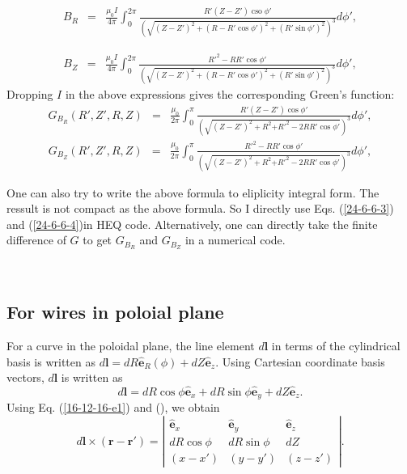 \documentclass{llncs}
\newcommand{\tmop}[1]{\ensuremath{\operatorname{#1}}}
\begin{document}
\begin{eqnarray*}
  B_R & = & \frac{\mu_0 I}{4 \pi} \int_0^{2 \pi} \frac{R'  (Z - Z') \tmop{cso}
  \phi'}{\left( \sqrt{(Z - Z')^2 + (R - R' \cos \phi')^2 + (R' \sin \phi')^2}
  \right)^3} d \phi',
\end{eqnarray*}

\begin{eqnarray*}
  B_Z & = & \frac{\mu_0 I}{4 \pi} \int_0^{2 \pi} \frac{{R'}^2 - R R' \cos
  \phi'}{\left( \sqrt{(Z - Z')^2 + (R - R' \cos \phi')^2 + (R' \sin \phi')^2}
  \right)^3} d \phi',
\end{eqnarray*}
Dropping $I$ in the above expressions gives the corresponding Green's
function:
\begin{eqnarray}
  \label{24-6-6-3} G_{B_R} (R', Z', R, Z) & = & \frac{\mu_0}{2 \pi}
  \int_0^{\pi} \frac{R' (Z - Z') \cos \phi'}{\left( \sqrt{(Z - Z')^2 + R^2 {+
  R'}^2 - 2 R R' \cos \phi'} \right)^3} d \phi', 
\end{eqnarray}
\begin{eqnarray}
  \label{24-6-6-4} G_{B_Z} (R', Z', R, Z) & = & \frac{\mu_0}{2 \pi}
  \int_0^{\pi} \frac{{R'}^2 - R R' \cos \phi'}{\left( \sqrt{(Z - Z')^2 + R^2
  {+ R'}^2 - 2 R R' \cos \phi'} \right)^3} d \phi', 
\end{eqnarray}


One can also try to write the above formula to eliplicity integral form. The
ressult is not compact as the above formula. So I directly use Eqs.
(\ref{24-6-6-3}) and (\ref{24-6-6-4})\quad in HEQ code. Alternatively, one can
directly take the finite difference of $G$ to get $G_{B_R}$ and $G_{B_Z}$ in a
numerical code.

\

\subsection{For wires in poloial plane}

For a curve in the poloidal plane, the line element $d\mathbf{l}$ in terms of
the cylindrical basis is written as $d\mathbf{l}= d R \hat{\mathbf{e}}_R
(\phi) + d Z \hat{\mathbf{e}}_z$. Using Cartesian coordinate basis vectors,
$d\mathbf{l}$ is written as
\begin{equation}
  \label{16-12-16-e1} d\mathbf{l}= d R \cos \phi \hat{\mathbf{e}}_x + d R \sin
  \phi \hat{\mathbf{e}}_y + d Z \hat{\mathbf{e}}_z .
\end{equation}
Using Eq. (\ref{16-12-16-e1}) and (), we obtain
\begin{equation}
  d\mathbf{l} \times (\mathbf{r}-\mathbf{r}') = \left|\begin{array}{ccc}
    \hat{\mathbf{e}}_x & \hat{\mathbf{e}}_y & \hat{\mathbf{e}}_z\\
    d R \cos \phi & d R \sin \phi & d Z\\
    (x - x') & (y - y') & (z - z')
  \end{array}\right| .
\end{equation}
\end{document}
